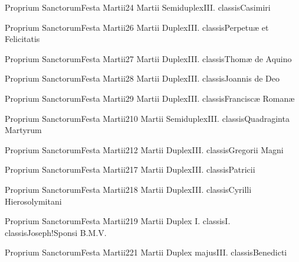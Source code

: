 \documentclass[nocturnale-romanum.tex]{subfiles}
\begin{document}

	{Proprium Sanctorum}{Festa Martii}{2}{4 Martii}
	{Semiduplex}{III. classis}{Casimiri}
	{}
	{}

	{Proprium Sanctorum}{Festa Martii}{2}{6 Martii}
	{Duplex}{III. classis}{Perpetuæ et Felicitatis}
	{}
	{}

	{Proprium Sanctorum}{Festa Martii}{2}{7 Martii}
	{Duplex}{III. classis}{Thomæ de Aquino}
	{}
	{}

	{Proprium Sanctorum}{Festa Martii}{2}{8 Martii}
	{Duplex}{III. classis}{Joannis de Deo}
	{}
	{}

	{Proprium Sanctorum}{Festa Martii}{2}{9 Martii}
	{Duplex}{III. classis}{Franciscæ Romanæ}
	{}
	{}

	{Proprium Sanctorum}{Festa Martii}{2}{10 Martii}
	{Semiduplex}{III. classis}{Quadraginta Martyrum}
	{}
	{}

	{Proprium Sanctorum}{Festa Martii}{2}{12 Martii}
	{Duplex}{III. classis}{Gregorii Magni}
	{}
	{}

	{Proprium Sanctorum}{Festa Martii}{2}{17 Martii}
	{Duplex}{III. classis}{Patricii}
	{}
	{}

	{Proprium Sanctorum}{Festa Martii}{2}{18 Martii}
	{Duplex}{III. classis}{Cyrilli Hierosolymitani}
	{}
	{}

	{Proprium Sanctorum}{Festa Martii}{2}{19 Martii}
	{Duplex I. classis}{I. classis}{Joseph!Sponsi B.M.V.}
	{}
	{}

	{Proprium Sanctorum}{Festa Martii}{2}{21 Martii}
	{Duplex majus}{III. classis}{Benedicti}
	{}
	{}
\end{document}
